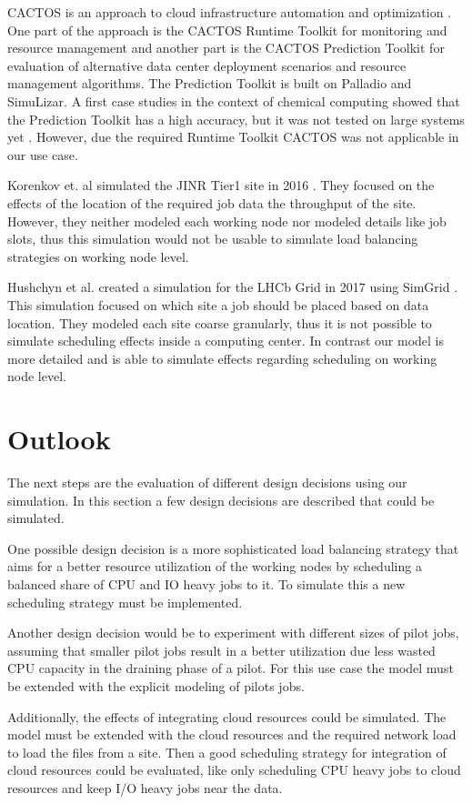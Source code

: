 \documentclass[runningheads,a4paper]{llncs}[2017/09/04]
\begin{document}
CACTOS is an approach to cloud infrastructure automation and optimization \cite{cactos}.
One part of the approach is the CACTOS Runtime Toolkit for monitoring and resource management and another part is the CACTOS Prediction Toolkit for evaluation of alternative data center deployment scenarios and resource management algorithms. The Prediction Toolkit is built on Palladio and SimuLizar.
A first case studies in the context of chemical computing showed that the Prediction Toolkit has a high accuracy, but it was not tested on large systems yet \cite{rapidtesting}. However, due the required Runtime Toolkit CACTOS was not applicable in our use case.

Korenkov et. al simulated the JINR Tier1 site in 2016 \cite{jinr}. They focused on the effects of the location of the required job data the throughput of the site. However, they neither modeled each working node nor modeled details like job slots, thus this simulation would not be usable to simulate load balancing strategies on working node level.

Hushchyn et al. created a simulation for the LHCb Grid in 2017 using SimGrid \cite{lhcb}. This simulation focused on which site a job should be placed based on data location. They modeled each site coarse granularly, thus it is not possible to simulate scheduling effects inside a computing center. In contrast our model is more detailed and is able to simulate effects regarding scheduling on working node level. 


\section{Outlook}
\label{outlook}
The next steps are the evaluation of different design decisions using our simulation. In this section a few design decisions are described that could be simulated.

One possible design decision is a more sophisticated load balancing strategy that aims for a better resource utilization of the working nodes by scheduling a balanced share of CPU and IO heavy jobs to it. To simulate this a new scheduling strategy must be implemented.

Another design decision would be to experiment with different sizes of pilot jobs, assuming that smaller pilot jobs result in a better utilization due less wasted CPU capacity in the draining phase of a pilot. For this use case the model must be extended with the explicit modeling of pilots jobs.

Additionally, the effects of integrating cloud resources could be simulated. The model must be extended with the cloud resources and the required network load to load the files from a site. Then a good scheduling strategy for integration of cloud resources could be evaluated, like only scheduling CPU heavy jobs to cloud resources and keep I/O heavy jobs near the data.
\end{document}
